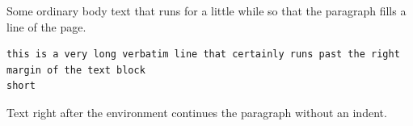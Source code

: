 \documentclass{article}
\begin{document}
Some ordinary body text that runs for a little while so that the paragraph fills a line of the page.
\begin{verbatim}
this is a very long verbatim line that certainly runs past the right margin of the text block
short
\end{verbatim}
Text right after the environment continues the paragraph without an indent.
\end{document}
